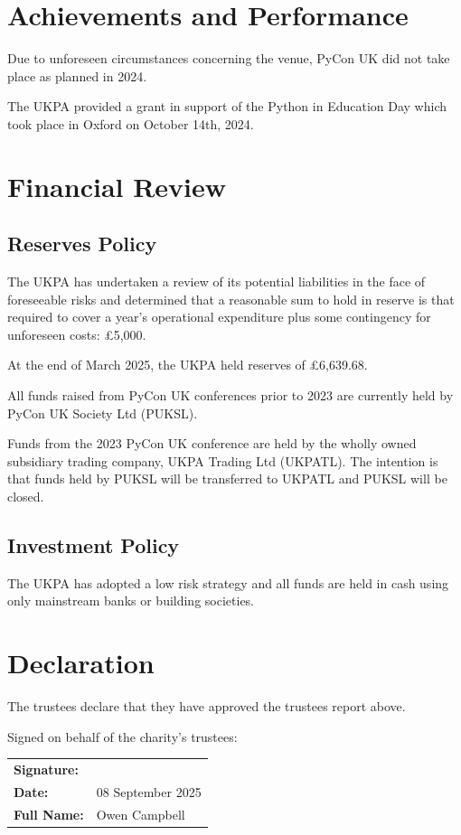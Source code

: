 \documentclass[11pt, final]{article}
\begin{document}
\section{Achievements and Performance}
Due to unforeseen circumstances concerning the venue, PyCon UK did not take place as planned in 2024.

The UKPA provided a grant in support of the Python in Education Day which took place in Oxford on October 14th, 2024.

\section{Financial Review}

\subsection{Reserves Policy}
The UKPA has undertaken a review of its potential liabilities in the face of foreseeable risks and determined that a reasonable sum to hold in reserve is that required to cover a year's operational expenditure plus some contingency for unforeseen costs: \pounds5,000.

At the end of March 2025, the UKPA held reserves of \pounds6,639.68.

All funds raised from PyCon UK conferences prior to 2023 are currently held by PyCon UK Society Ltd (PUKSL). 

Funds from the 2023 PyCon UK conference are held by the wholly owned subsidiary trading company, UKPA Trading Ltd (UKPATL). The intention is that funds held by PUKSL will be transferred to UKPATL and PUKSL will be closed.

\subsection{Investment Policy}
The UKPA has adopted a low risk strategy and all funds are held in cash using only mainstream banks or building societies.

\section{Declaration}
The trustees declare that they have approved the trustees report above.
 
Signed on behalf of the charity's trustees:

\begin{tabular}{l l}
	\textbf{Signature:}\vspace{3cm}                       \\
	\textbf{Date:} & 08 September 2025\vspace{1cm} \\
	\textbf{Full Name:} & Owen Campbell                   \\
\end{tabular}
\end{document}
